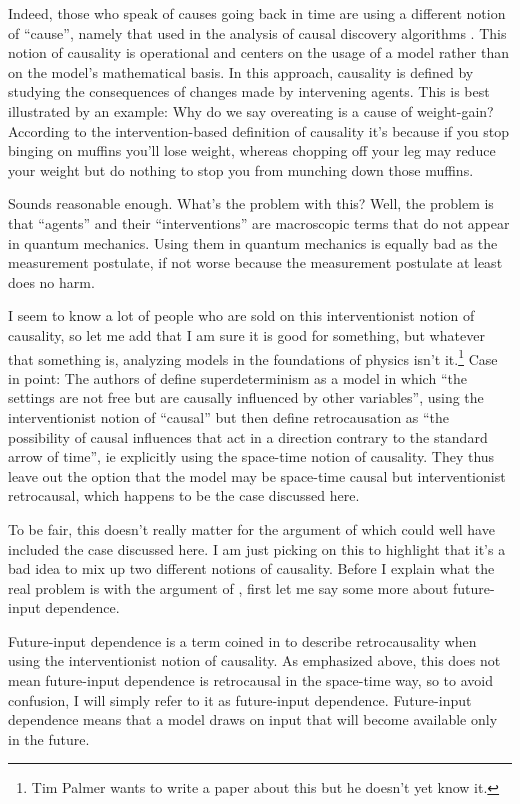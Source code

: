 \documentclass[12pt]{article}
\begin{document}
Indeed, those who speak of causes going back in time are using a different notion of ``cause'', namely that used
in the analysis of causal discovery algorithms \cite{Pearl,Spirtes}. This notion of causality is operational and centers
on the usage of a model rather than on the model's mathematical basis. In this approach, causality is defined 
by studying the consequences of changes made by intervening agents.  This is best illustrated by an example: Why
do we say overeating is a cause of weight-gain? According to the intervention-based definition of causality
it's because if you stop binging on muffins you'll lose weight, whereas chopping
off your leg may reduce your weight but do nothing to stop you from munching down those muffins. 

Sounds reasonable enough. What's the problem with this? Well, the problem is that
``agents'' and their ``interventions'' are macroscopic terms that do not appear in quantum mechanics. 
Using them in quantum mechanics is equally bad as the measurement postulate, if not worse because the measurement postulate
at least does no harm. 

I seem to know a lot of people who are sold on this interventionist notion of causality, so let me add that I am
sure it is good for something, but whatever that something is, analyzing models in the foundations
of physics isn't it.\footnote{Tim Palmer wants to write a paper about this but he doesn't yet know it.} Case in
point: The authors of \cite{finetuning} define superdeterminism as a model in which ``the settings are not free but are
causally influenced by other variables'', using the interventionist notion of ``causal'' but then define retrocausation as
``the possibility of causal influences that act in a direction contrary to the standard arrow
of time'', ie explicitly using the space-time notion of causality. They thus leave out the option that the model may
be space-time causal but interventionist retrocausal, which happens to be the case discussed here. 

To be fair, this doesn't really matter for the argument of \cite{finetuning} which could well have included the
case discussed here. I am just picking on this to highlight that it's a bad idea to mix up two different
notions of causality. Before I explain what the real problem is with the argument of \cite{finetuning}, 
first let me say some more about future-input dependence. 

Future-input dependence is a term coined in \cite{Wharton} to describe retrocausality when using the interventionist notion
of causality. As emphasized above, this does not mean future-input dependence is retrocausal in the space-time way, so to avoid confusion,
I will simply refer to it as future-input dependence. Future-input dependence means that a model draws on 
input that will become available only in the future. 
\end{document}
